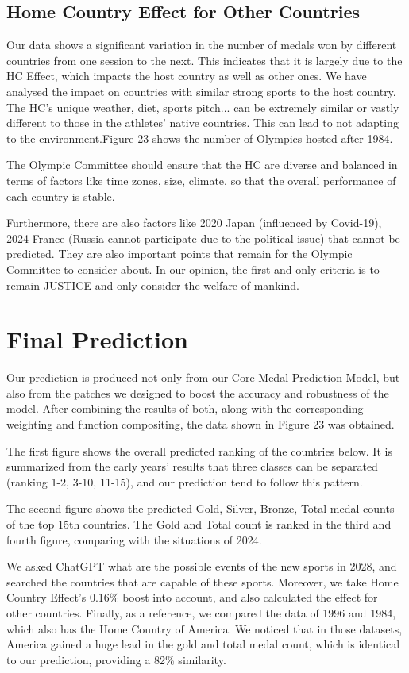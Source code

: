 \documentclass{mcmthesis}
\begin{document}
\subsection{Home Country Effect for Other Countries}
Our data shows a significant variation in the number of medals won by different countries from one session to the next. This indicates that it is largely due to the HC Effect, which impacts the host country as well as other ones. We have analysed the impact on countries with similar strong sports to the host country. The HC's unique weather, diet, sports pitch... can be extremely similar or vastly different to those in the athletes' native countries. This can lead to not adapting to the environment.Figure 23 shows the number of Olympics hosted after 1984.

The Olympic Committee should ensure that the HC are diverse and balanced in terms of factors like time zones, size, climate, so that the overall performance of each country is stable.

Furthermore, there are also factors like 2020 Japan (influenced by Covid-19), 2024 France (Russia cannot participate due to the political issue) that cannot be predicted. They are also important points that remain for the Olympic Committee to consider about. In our opinion, the first and only criteria is to remain JUSTICE and only consider the welfare of mankind.

\section{Final Prediction}

Our prediction is produced not only from our Core Medal Prediction Model, but also from the patches we designed to boost the accuracy and robustness of the model. After combining the results of both, along with the corresponding weighting and function compositing, the data shown in Figure 23 was obtained.

The first figure shows the overall predicted ranking of the countries below. It is summarized from the early years' results that three classes can be separated (ranking 1-2, 3-10, 11-15), and our prediction tend to follow this pattern.

The second figure shows the predicted Gold, Silver, Bronze, Total medal counts of the top 15th countries. The Gold and Total count is ranked in the third and fourth figure, comparing with the situations of 2024.

We asked ChatGPT what are the possible events of the new sports in 2028, and searched the countries that are capable of these sports. Moreover, we take Home Country Effect's 0.16\% boost into account, and also calculated the effect for other countries. Finally, as a reference, we compared the data of 1996 and 1984, which also has the Home Country of America. We noticed that in those datasets, America gained a huge lead in the gold and total medal count, which is identical to our prediction, providing a 82\% similarity.
\end{document}
